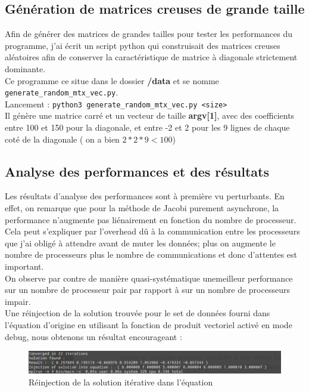 \documentclass[11pt, a4paper]{article}
\begin{document}
\subsection{Génération de matrices creuses de grande taille}

Afin de générer des matrices de grandes tailles pour tester les performances du programme, j'ai écrit un script python qui construisait des matrices creuses aléatoires afin de conserver la caractéristique de matrice à diagonale strictement dominante.\\

Ce programme ce situe dans le dossier \textbf{/data} et se nomme \texttt{generate\_random\_mtx\_vec.py}.\\

Lancement : \texttt{python3 generate\_random\_mtx\_vec.py <size>}\\

Il génère une matrice carré et un vecteur de taille \textbf{argv[1]}, avec des coefficients entre 100 et 150 pour la diagonale, et entre -2 et 2 pour les 9 lignes de chaque coté de la diagonale ( on a bien $2*2*9 < 100 $)

\subsection{Analyse des performances et des résultats}

Les résultats d'analyse des performances sont à première vu perturbants. En effet, on remarque que pour la méthode de Jacobi purement asynchrone, la performance n'augmente  pas liénairement en fonction du nombre de processeur.\\

Cela peut s'expliquer par l'overhead d\^u à la communication entre les processeurs que j'ai obligé à attendre avant de muter les données; plus on augmente le nombre de processeurs plus le nombre de communications et donc d'attentes est important.\\

On observe par contre de manière quasi-systématique unemeilleur performance sur un nombre de processeur pair par rapport à sur un nombre de processeurs impair.\\

Une réinjection de la solution trouvée pour le set de données fourni dans l'équation d'origine en utilisant la fonction de produit vectoriel activé en mode debug, nous obtenons un résultat encourageant :

\begin{figure}[h]
    \centering
    \includegraphics[width=350pt]{convergence.png}
    \caption{Réinjection de la solution itérative dans l'équation}
\end{figure}
\end{document}
